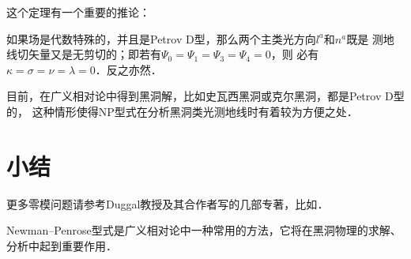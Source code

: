 这个定理有一个重要的推论：
\begin{corollary}\label{chnull:thm_BHD}
    如果场是代数特殊的，并且是Petrov D型，那么两个主类光方向$l^a$和$n^a$既是
    测地线切矢量又是无剪切的；即若有$\Psi_0=\Psi_1=\Psi_3=\Psi_4=0$，则
    必有$\kappa=\sigma=\nu=\lambda=0$．反之亦然．
\end{corollary}

目前，在广义相对论中得到黑洞解，比如史瓦西黑洞或克尔黑洞，都是Petrov D型的，
这种情形使得NP型式在分析黑洞类光测地线时有着较为方便之处．




\section*{小结}

更多零模问题请参考Duggal教授及其合作者写的几部专著，比如\parencite{Duggal-Bejancu-1996}．

Newman--Penrose型式是广义相对论中一种常用的方法，它将在黑洞物理的求解、分析中起到重要作用．





\endinput